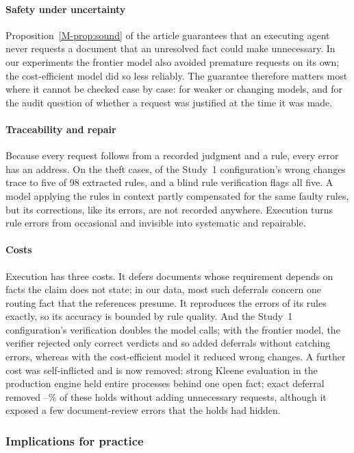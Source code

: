 \paragraph{Safety under uncertainty}
Proposition~\ref{M-prop:sound} of the article guarantees that an executing agent never requests a document that an unresolved fact could make unnecessary. In our experiments the frontier model also avoided premature requests on its own; the cost-efficient model did so less reliably. The guarantee therefore matters most where it cannot be checked case by case: for weaker or changing models, and for the audit question of whether a request was justified at the time it was made.

\paragraph{Traceability and repair}
Because every request follows from a recorded judgment and a rule, every error has an address. On the theft cases, \ecWrongFaulty{} of the Study~1 configuration's \thTerraCPWrong{} wrong changes trace to five of 98 extracted rules, and a blind rule verification flags all five. A model applying the rules in context partly compensated for the same faulty rules, but its corrections, like its errors, are not recorded anywhere. Execution turns rule errors from occasional and invisible into systematic and repairable.

\paragraph{Costs}
Execution has three costs. It defers documents whose requirement depends on facts the claim does not state; in our data, most such deferrals concern one routing fact that the references presume. It reproduces the errors of its rules exactly, so its accuracy is bounded by rule quality. And the Study~1 configuration's verification doubles the model calls; with the frontier model, the verifier rejected only correct verdicts and so added deferrals without catching errors, whereas with the cost-efficient model it reduced wrong changes. A further cost was self-inflicted and is now removed: strong Kleene evaluation in the production engine held entire processes behind one open fact; exact deferral removed \tenTerraExactCut--\tenLunaExactCut\% of these holds without adding unnecessary requests, although it exposed a few document-review errors that the holds had hidden.

\subsubsection{Implications for practice}
\label{app:s1-practice}

